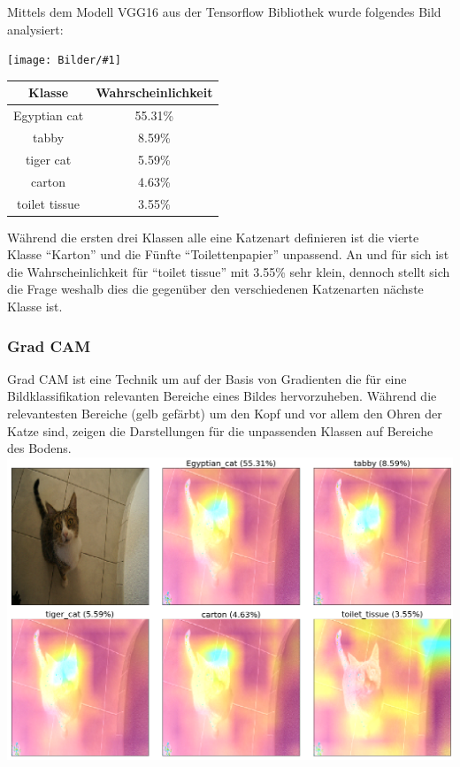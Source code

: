 \documentclass[
  12pt, %
  a4paper, %
  oneside, %
  openany, 
  numbers=noenddot, %
  BCOR=5mm, %
  parskip=half*, %
  thesis, %
]{bfhbook}
\newcommand{\imgText}[2]{
\begin{center}
    \begin{minipage}[t]{0.6\textwidth}
    		\vspace{0pt}
		\texttt{[image: Bilder/\#1]}
	\end{minipage}\hfill
    \begin{minipage}[t]{0.4\textwidth}
    		\vspace{0pt}
  		#2
    \end{minipage}
\end{center}
}
\begin{document}
Mittels dem Modell VGG16 aus der Tensorflow Bibliothek \cite{vgg16} wurde folgendes Bild analysiert:
\imgText{Mira.jpg}{
		\begin{tabular}{ |c|c| } 
		 \hline
		 Klasse & Wahrscheinlichkeit \\
		 \hline
		 Egyptian cat & 55.31\% \\ 
		 tabby & 8.59\% \\ 
		 tiger cat & 5.59\% \\ 
		 carton & 4.63\% \\
		 toilet tissue & 3.55\% \\
		 \hline
		\end{tabular}
		\break
		Während die ersten drei Klassen alle eine Katzenart definieren ist die vierte Klasse ``Karton'' und die Fünfte ``Toilettenpapier'' unpassend. An und für sich ist die Wahrscheinlichkeit für ``toilet tissue'' mit 3.55\% sehr klein, dennoch stellt sich die Frage weshalb dies die gegenüber den verschiedenen Katzenarten nächste Klasse ist.
}

\subsubsection*{Grad CAM} \break
\Gls{Grad CAM} ist eine Technik \parencite{Selvaraju2016} um auf der Basis von Gradienten die für eine Bildklassifikation relevanten Bereiche eines Bildes hervorzuheben. Während die relevantesten Bereiche (gelb gefärbt) um den Kopf und vor allem den Ohren der Katze sind, zeigen die Darstellungen für die unpassenden Klassen auf Bereiche des Bodens.
\includegraphics[width=\textwidth]{Bilder/Grad-Cam-Classes.png}
\end{document}
